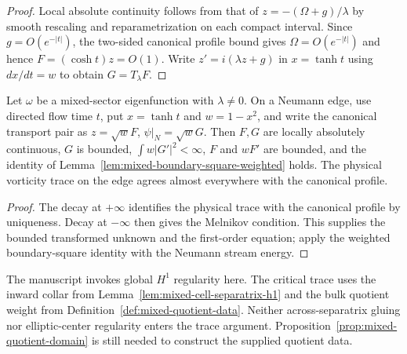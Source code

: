 \begin{proof}
Local absolute continuity follows from that of $z=-({\Omega}+g)/\lambda$
by smooth rescaling and reparametrization on each compact interval.
Since $g=O(e^{-|t|})$, the two-sided canonical profile bound gives
$\Omega=O(e^{-|t|})$ and hence $F=(\cosh t)z=O(1)$.
Write $z'=i(\lambda z+g)$ in $x=\tanh t$ using $dx/dt=w$ to obtain
$G=T_\lambda F$.
\leanok
\end{proof}

\begin{lemma}
\label{lem:mixed-boundary-square-traces}
\leanok
Let $\omega$ be a mixed-sector eigenfunction with $\lambda\ne0$.
On a Neumann edge, use directed flow time $t$, put $x=\tanh t$ and
$w=1-x^2$, and write the canonical transport pair as
$z=\sqrt wF$, $\psi|_N=\sqrt wG$.
Then $F,G$ are locally absolutely continuous, $G$ is bounded,
$\int w|G'|^2<\infty$, $F$ and $wF'$ are bounded, and the identity of
Lemma~\ref{lem:mixed-boundary-square-weighted} holds. The physical vorticity
trace on the edge agrees almost everywhere with the canonical profile.
\end{lemma}

\begin{proof}
The decay at $+\infty$ identifies the physical trace with the canonical
profile by uniqueness. Decay at $-\infty$ then gives the Melnikov
condition. This supplies the bounded transformed unknown and the
first-order equation; apply the weighted boundary-square identity
with the Neumann stream energy.
\leanok
\end{proof}

\begin{remark}
The manuscript invokes global $H^1$ regularity here. The critical
trace uses the inward collar from Lemma~\ref{lem:mixed-cell-separatrix-h1}
and the bulk quotient weight from Definition~\ref{def:mixed-quotient-data}.
Neither across-separatrix gluing nor elliptic-center regularity enters
the trace argument. Proposition~\ref{prop:mixed-quotient-domain}
is still needed to construct the supplied quotient data.
\end{remark}

